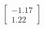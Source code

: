 \documentclass[preview]{standalone}
\begin{document}
\begin{align*}
\begin{bmatrix} -1.17 \\ 1.22 \end{bmatrix}
\end{align*}
\end{document}
